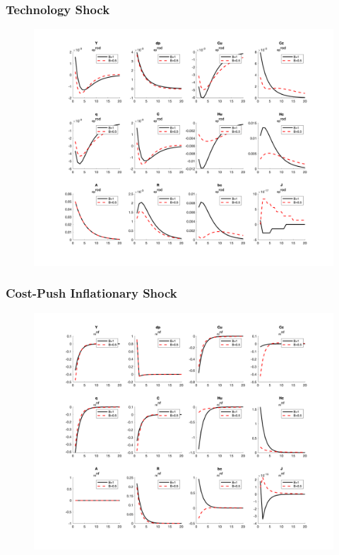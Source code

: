 \documentclass[11pt, a4paper]{article}
\begin{document}
\subsubsection{Technology Shock}
\begin{figure}[H]\centering
  \includegraphics[scale=0.5]{../figs/_e_prod}
  \caption{}
\end{figure}

\subsubsection{Cost-Push Inflationary Shock}
\begin{figure}[H]\centering
  \includegraphics[scale=0.5]{../figs/_n_inf}
  \caption{}
\end{figure}
\end{document}
